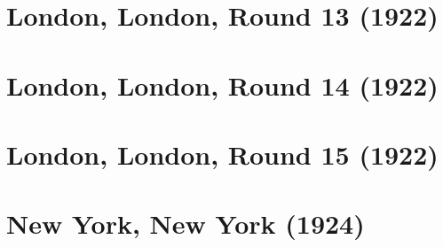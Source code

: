 \documentclass[11pt]{article}
\begin{document}
\clearpage

\section{London, London, Round 13 (1922)}


\clearpage

\section{London, London, Round 14 (1922)}


\clearpage

\section{London, London, Round 15 (1922)}


\clearpage

\section{New York, New York (1924)}


\clearpage



\clearpage



\clearpage



\clearpage



\clearpage



\clearpage



\clearpage



\clearpage



\clearpage



\clearpage



\clearpage



\clearpage
\end{document}

